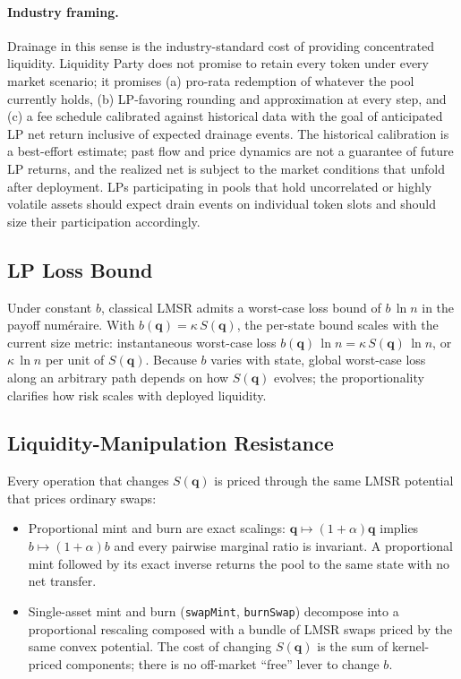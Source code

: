 \documentclass[11pt]{article}
\newcommand{\Sm}{S(\mathbf{q})}
\newcommand{\bofq}{b(\mathbf{q})}
\begin{document}
\paragraph{Industry framing.}
Drainage in this sense is the industry-standard cost of providing
concentrated liquidity. Liquidity Party does not promise to retain every
token under every market scenario; it promises (a) pro-rata redemption
of whatever the pool currently holds, (b) LP-favoring rounding and
approximation at every step, and (c) a fee schedule calibrated against
historical data with the goal of anticipated LP net return inclusive of
expected drainage events. The historical calibration is a best-effort
estimate; past flow and price dynamics are not a guarantee of future LP
returns, and the realized net is subject to the market conditions that
unfold after deployment. LPs participating in pools that hold
uncorrelated or highly volatile assets should expect drain events on
individual token slots and should size their participation accordingly.

\subsection{LP Loss Bound}

Under constant $b$, classical LMSR admits a worst-case loss bound of
$b\,\ln n$ in the payoff num\'eraire. With $\bofq = \kappa\,\Sm$, the
per-state bound scales with the current size metric: instantaneous worst-case
loss $\bofq\,\ln n = \kappa\,\Sm\,\ln n$, or $\kappa\,\ln n$ per unit of
$\Sm$. Because $b$ varies with state, global worst-case loss along an
arbitrary path depends on how $\Sm$ evolves; the proportionality clarifies
how risk scales with deployed liquidity.

\subsection{Liquidity-Manipulation Resistance}

Every operation that changes $\Sm$ is priced through the same LMSR potential
that prices ordinary swaps:

\begin{itemize}
  \item Proportional mint and burn are exact scalings:
        $\mathbf{q} \mapsto (1+\alpha)\mathbf{q}$ implies
        $b \mapsto (1+\alpha)b$ and every pairwise marginal ratio is
        invariant. A proportional mint followed by its exact inverse returns
        the pool to the same state with no net transfer.
  \item Single-asset mint and burn (\texttt{swapMint}, \texttt{burnSwap})
        decompose into a proportional rescaling composed with a bundle of
        LMSR swaps priced by the same convex potential. The cost of changing
        $\Sm$ is the sum of kernel-priced components; there is no off-market
        ``free'' lever to change $b$.
\end{itemize}
\end{document}
